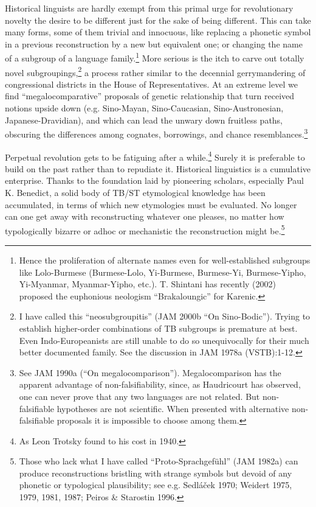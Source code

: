 Historical linguists are hardly exempt from this primal urge for revolutionary novelty  the desire to be different just for the sake of being different. This can take many forms, some of them trivial and innocuous, like replacing a phonetic symbol in a previous reconstruction by a new but equivalent one; or changing the name of a subgroup of a language family.\footnote{Hence the proliferation of alternate names even for well-established subgroups like Lolo-Burmese (Burmese-Lolo, Yi-Burmese, Burmese-Yi, Burmese-Yipho, Yi-Myanmar, Myanmar-Yipho, etc.). T. Shintani has recently (2002) proposed the euphonious neologism “Brakaloungic” for Karenic.}
More serious is the itch to carve out totally novel subgroupings,\footnote{I have called this “neosubgroupitis” (JAM 2000b “On Sino-Bodic”). Trying to establish higher-order combinations of TB subgroups is premature at best. Even Indo-Europeanists are still unable to do so unequivocally for their much better documented family. See the discussion in JAM 1978a (VSTB):1-12.} a process rather similar to the decennial gerrymandering of congressional districts in the House of Representatives. At an extreme level we find “megalocomparative” proposals of genetic relationship that turn received notions upside down (e.g. Sino-Mayan, Sino-Caucasian, Sino-Austronesian, Japanese-Dravidian), and which can lead the unwary down fruitless paths, obscuring the differences among cognates, borrowings, and chance resemblances.\footnote{See JAM 1990a (“On megalocomparison”). Megalocomparison has the apparent advantage of non-falsifiability, since, as Haudricourt has observed, one can never prove that any two languages are not related. But non-falsifiable hypotheses are not scientific. When presented with alternative non-falsifiable proposals it is impossible to choose among them.}

Perpetual revolution gets to be fatiguing after a while.\footnote{As Leon Trotsky found to his cost in 1940.} Surely it is preferable to build on the past rather than to repudiate it. Historical linguistics is a cumulative enterprise. Thanks to the foundation laid by pioneering scholars, especially Paul K. Benedict, a solid body of TB/ST etymological knowledge has been accumulated, in terms of which new etymologies must be evaluated. No longer can one get away with reconstructing whatever one pleases, no matter how typologically bizarre or adhoc or mechanistic the reconstruction might be.\footnote{Those who lack what I have called “Proto-Sprachgef\"uhl” (JAM 1982a) can produce reconstructions bristling with strange symbols but devoid of any phonetic or typological plausibility; see e.g. Sedl\'a\v{c}ek 1970; Weidert 1975, 1979, 1981, 1987; Peiros \& Starostin 1996.}

